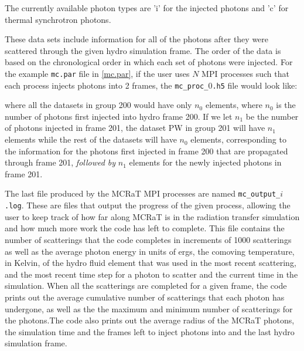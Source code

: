 \documentclass[12pt,a4paper]{article}
\begin{document}
The currently available photon types are 'i' for the injected photons and 'c' for thermal synchrotron photons. 

These data sets include information for all of the photons after they were scattered through the given hydro simulation frame. The order of the data is based on the chronological order in which each set of photons were injected. For the example \texttt{mc.par} file in \autoref{mc.par}, if the user uses $N$ MPI processes such that each process injects photons into 2 frames, the \texttt{mc\_proc\_$0$.h5} file would look like:
\begin{figure}[h!]
 \end{figure}
 
\newpage where all the datasets in group 200 would have only $n_{0}$ elements, where $n_{0}$ is the number of photons first injected into hydro frame 200. If we let $n_{1}$ be the number of photons injected in frame 201, the dataset PW in group 201 will have $n_{1}$ elements while the rest of the datasets will have $n_{0}$ elements, corresponding to the information for the photons first injected in frame 200 that are propagated through frame 201, \textit{followed by} $n_{1}$ elements for the newly injected photons in frame 201. 

The last file produced by the MCRaT MPI processes are named \texttt{mc\_output\_$i$.log}. These are files that output the progress of the given process, allowing the user to keep track of how far along MCRaT is in the radiation transfer simulation and how much more work the code has left to complete. This file contains the number of scatterings that the code completes in increments of 1000 scatterings as well as the average photon energy in units of ergs, the comoving temperature, in Kelvin, of the hydro fluid element that was used in the most recent scattering, and the most recent time step for a photon to scatter and the current time in the simulation. When all the scatterings are completed for a given frame, the code prints out the average cumulative number of scatterings that each photon has undergone, as well as the the maximum and minimum number of scatterings for the photons.The code also prints out the average radius of the MCRaT photons, the simulation time and the frames left to inject photons into and the last hydro simulation frame.
\end{document}

